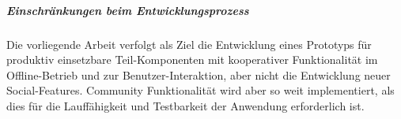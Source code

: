 \subparagraph{Einschränkungen beim Entwicklungsprozess}\label{4_ES}
Die vorliegende Arbeit verfolgt als Ziel die Entwicklung eines Prototyps für produktiv einsetzbare Teil-Komponenten mit kooperativer Funktionalität im Offline-Betrieb und zur Benutzer-Interaktion, aber nicht die Entwicklung neuer Social-Features. Community Funktionalität wird aber so weit implementiert, als dies für die Lauffähigkeit und Testbarkeit der Anwendung erforderlich ist.


